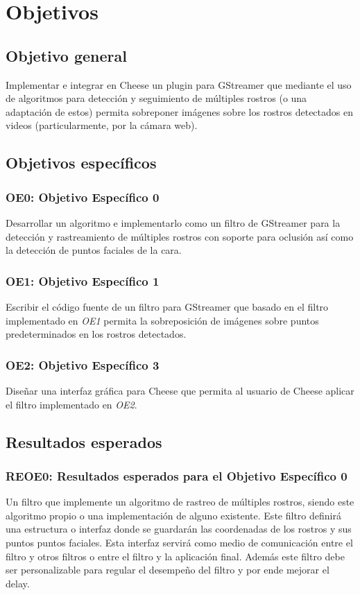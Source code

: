 \documentclass[a4paper,openright,12pt]{report}
\begin{document}
\section{Objetivos}
\subsection{Objetivo general}
Implementar e integrar en Cheese un plugin para GStreamer que mediante el uso de
algoritmos para detección y seguimiento de múltiples rostros (o una adaptación
de estos) permita sobreponer imágenes sobre los rostros detectados en videos
(particularmente, por la cámara web).

\subsection{Objetivos específicos}
\subsubsection{OE0: Objetivo Específico 0}
Desarrollar un algoritmo e implementarlo como un filtro de GStreamer para
la detección y rastreamiento de múltiples rostros con soporte para oclusión
así como la detección de puntos faciales de la cara.
\subsubsection{OE1: Objetivo Específico 1}
Escribir el código fuente de un filtro para GStreamer que basado en el filtro
implementado en \textit{OE1} permita la sobreposición de imágenes sobre puntos
predeterminados en los rostros detectados.
\subsubsection{OE2: Objetivo Específico 3}
Diseñar una interfaz gráfica para Cheese que permita al usuario de Cheese
aplicar el filtro implementado en \textit{OE2}.

\subsection{Resultados esperados}
\subsubsection{REOE0: Resultados esperados para el Objetivo Específico 0}
Un filtro que implemente un algoritmo de rastreo de múltiples rostros, siendo
este algoritmo propio o una implementación de alguno existente. Este filtro
definirá una estructura o interfaz donde se guardarán las coordenadas de los
rostros y sus puntos puntos faciales. Esta interfaz servirá como medio de
comunicación entre el filtro y otros filtros o entre el filtro y la aplicación
final. Además este filtro debe ser personalizable para regular el desempeño del
filtro y por ende mejorar el delay.
\end{document}

